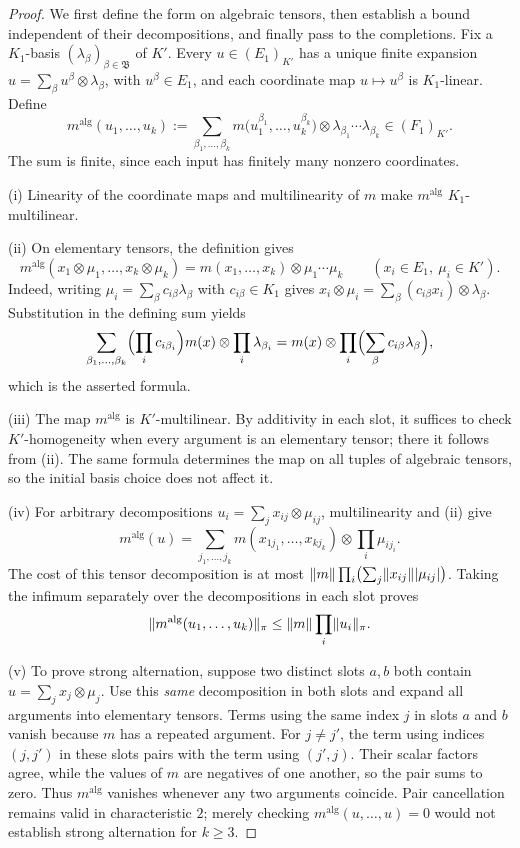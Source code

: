 \begin{proof}
We first define the form on algebraic tensors, then establish a bound independent of their decompositions, and
finally pass to the completions. Fix a $K_1$\nobreakdash-basis $(\lambda_\beta)_{\beta\in\mathfrak B}$ of $K'$.
Every $u\in(E_1)_{K'}$ has a unique finite expansion
$u=\sum_\beta u^\beta\otimes\lambda_\beta$, with $u^\beta\in E_1$, and each coordinate map $u\mapsto u^\beta$ is
$K_1$\nobreakdash-linear. Define
\[
m^{\mathrm{alg}}(u_1,\dots,u_k):=
\sum_{\beta_1,\dots,\beta_k}
m\bigl(u_1^{\beta_1},\dots,u_k^{\beta_k}\bigr)\otimes
\lambda_{\beta_1}\cdots\lambda_{\beta_k}\in(F_1)_{K'}.
\]
The sum is finite, since each input has finitely many nonzero coordinates.

\textup{(i)} Linearity of the coordinate maps and multilinearity of $m$ make $m^{\mathrm{alg}}$
$K_1$\nobreakdash-multilinear.

\textup{(ii)} On elementary tensors, the definition gives
\[
m^{\mathrm{alg}}(x_1\otimes\mu_1,\dots,x_k\otimes\mu_k)
=m(x_1,\dots,x_k)\otimes\mu_1\cdots\mu_k
\qquad(x_i\in E_1,\ \mu_i\in K').
\]
Indeed, writing $\mu_i=\sum_\beta c_{i\beta}\lambda_\beta$ with $c_{i\beta}\in K_1$ gives
$x_i\otimes\mu_i=\sum_\beta(c_{i\beta}x_i)\otimes\lambda_\beta$. Substitution in the defining sum yields
\[
\sum_{\beta_1,\dots,\beta_k}
\Bigl(\prod_ic_{i\beta_i}\Bigr)m(x)\otimes\prod_i\lambda_{\beta_i}
=m(x)\otimes\prod_i\Bigl(\sum_\beta c_{i\beta}\lambda_\beta\Bigr),
\]
which is the asserted formula.

\textup{(iii)} The map $m^{\mathrm{alg}}$ is $K'$\nobreakdash-multilinear. By additivity in each slot, it suffices
to check $K'$\nobreakdash-homogeneity when every argument is an elementary tensor; there it follows from
\textup{(ii)}. The same formula determines the map on all tuples of algebraic tensors, so the initial basis
choice does not affect it.

\textup{(iv)} For arbitrary decompositions $u_i=\sum_jx_{ij}\otimes\mu_{ij}$, multilinearity and \textup{(ii)} give
\[
m^{\mathrm{alg}}(u)=
\sum_{j_1,\dots,j_k}m(x_{1j_1},\dots,x_{kj_k})\otimes\prod_i\mu_{ij_i}.
\]
The cost of this tensor decomposition is at most
$\lVert m\rVert\prod_i\bigl(\sum_j\lVert x_{ij}\rVert\lvert \mu_{ij}\rvert\bigr)$.
Taking the infimum separately over the decompositions in each slot proves
\[
\lVert m^{\mathrm{alg}}(u_1,\dots,u_k)\rVert_\pi\le\lVert m\rVert\prod_i\lVert u_i\rVert_\pi.
\]

\textup{(v)} To prove strong alternation, suppose two distinct slots $a,b$ both contain
$u=\sum_jx_j\otimes\mu_j$. Use this \emph{same} decomposition in both slots and expand all arguments into
elementary tensors. Terms using the same index $j$ in slots $a$ and $b$ vanish because $m$ has a repeated
argument. For $j\ne j'$, the term using indices $(j,j')$ in these slots pairs with the term using $(j',j)$.
Their scalar factors agree, while the values of $m$ are negatives of one another, so the pair sums to zero.
Thus $m^{\mathrm{alg}}$ vanishes whenever any two arguments coincide. Pair cancellation remains valid in
characteristic $2$; merely checking $m^{\mathrm{alg}}(u,\dots,u)=0$ would not establish strong alternation for
$k\ge3$.


\end{proof}
